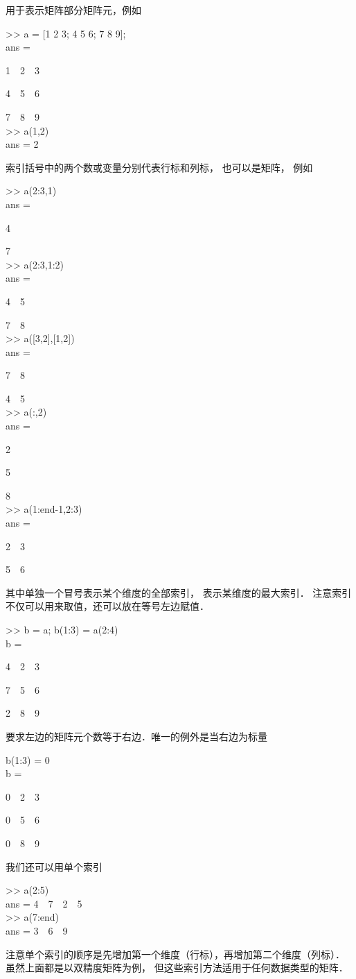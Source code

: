  用于表示矩阵部分矩阵元，例如
\begin{Command}
>> a = [1 2 3; 4 5 6; 7 8 9]; \\
ans = \par
1\ \ 2\ \ 3 \par
4\ \ 5\ \ 6 \par
7\ \ 8\ \ 9 \\
>> a(1,2) \\
ans = 2
\end{Command}
索引括号中的两个数或变量分别代表行标和列标， 也可以是矩阵， 例如
\begin{Command}
>> a(2:3,1) \\
ans = \par
4 \par
7 \\
>> a(2:3,1:2) \\
ans = \par
4\ \ 5 \par
7\ \ 8 \\
>> a([3,2],[1,2]) \\
ans = \par
7\ \ 8 \par
4\ \ 5 \\
>> a(:,2) \\
ans = \par
2 \par
5 \par
8 \\
>> a(1:end-1,2:3) \\
ans = \par
2\ \ 3 \par
5\ \ 6
\end{Command}
其中单独一个冒号表示某个维度的全部索引，  表示某维度的最大索引． 注意索引不仅可以用来取值，还可以放在等号左边赋值．
\begin{Command}
>> b = a; b(1:3) = a(2:4) \\
b = \par
4\ \ 2\ \ 3 \par
7\ \ 5\ \ 6 \par
2\ \ 8\ \ 9
\end{Command}
要求左边的矩阵元个数等于右边．唯一的例外是当右边为标量
\begin{Command}
b(1:3) = 0 \\
b = \par
0\ \ 2\ \ 3 \par
0\ \ 5\ \ 6 \par
0\ \ 8\ \ 9 
\end{Command}
我们还可以用单个索引
\begin{Command}
>> a(2:5)\\
ans = 4\ \ 7\ \ 2\ \ 5 \\
>> a(7:end)\\
ans = 3\ \ 6\ \ 9
\end{Command}
注意单个索引的顺序是先增加第一个维度（行标），再增加第二个维度（列标）． 虽然上面都是以双精度矩阵为例， 但这些索引方法适用于任何数据类型的矩阵．


